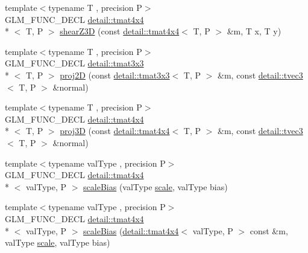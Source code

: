 \begin{DoxyCompactItemize}
\item 
{\footnotesize template$<$typename T , precision P$>$ }\\G\-L\-M\-\_\-\-F\-U\-N\-C\-\_\-\-D\-E\-C\-L \hyperlink{structglm_1_1detail_1_1tmat4x4}{detail\-::tmat4x4}\\*
$<$ T, P $>$ \hyperlink{group__gtx__transform2_ga02fa747667daf42b64ea344d1076acee}{shear\-Z3\-D} (const \hyperlink{structglm_1_1detail_1_1tmat4x4}{detail\-::tmat4x4}$<$ T, P $>$ \&m, T x, T y)
\item 
{\footnotesize template$<$typename T , precision P$>$ }\\G\-L\-M\-\_\-\-F\-U\-N\-C\-\_\-\-D\-E\-C\-L \hyperlink{structglm_1_1detail_1_1tmat3x3}{detail\-::tmat3x3}\\*
$<$ T, P $>$ \hyperlink{group__gtx__transform2_gad51e1fa33875b966db2f97cb7f21c48a}{proj2\-D} (const \hyperlink{structglm_1_1detail_1_1tmat3x3}{detail\-::tmat3x3}$<$ T, P $>$ \&m, const \hyperlink{structglm_1_1detail_1_1tvec3}{detail\-::tvec3}$<$ T, P $>$ \&normal)
\item 
{\footnotesize template$<$typename T , precision P$>$ }\\G\-L\-M\-\_\-\-F\-U\-N\-C\-\_\-\-D\-E\-C\-L \hyperlink{structglm_1_1detail_1_1tmat4x4}{detail\-::tmat4x4}\\*
$<$ T, P $>$ \hyperlink{group__gtx__transform2_ga70a21b940727b94060fd3826eeacb048}{proj3\-D} (const \hyperlink{structglm_1_1detail_1_1tmat4x4}{detail\-::tmat4x4}$<$ T, P $>$ \&m, const \hyperlink{structglm_1_1detail_1_1tvec3}{detail\-::tvec3}$<$ T, P $>$ \&normal)
\item 
{\footnotesize template$<$typename val\-Type , precision P$>$ }\\G\-L\-M\-\_\-\-F\-U\-N\-C\-\_\-\-D\-E\-C\-L \hyperlink{structglm_1_1detail_1_1tmat4x4}{detail\-::tmat4x4}\\*
$<$ val\-Type, P $>$ \hyperlink{group__gtx__transform2_ga0a387ae1a7fd1a2ca451ac47833ee3e2}{scale\-Bias} (val\-Type \hyperlink{group__gtc__matrix__transform_gabd40959f269abd16c256a4f59ab03d62}{scale}, val\-Type bias)
\item 
{\footnotesize template$<$typename val\-Type , precision P$>$ }\\G\-L\-M\-\_\-\-F\-U\-N\-C\-\_\-\-D\-E\-C\-L \hyperlink{structglm_1_1detail_1_1tmat4x4}{detail\-::tmat4x4}\\*
$<$ val\-Type, P $>$ \hyperlink{group__gtx__transform2_gae733630f90c53ca3dce8daf50f25d6ab}{scale\-Bias} (\hyperlink{structglm_1_1detail_1_1tmat4x4}{detail\-::tmat4x4}$<$ val\-Type, P $>$ const \&m, val\-Type \hyperlink{group__gtc__matrix__transform_gabd40959f269abd16c256a4f59ab03d62}{scale}, val\-Type bias)

\end{DoxyCompactItemize}
